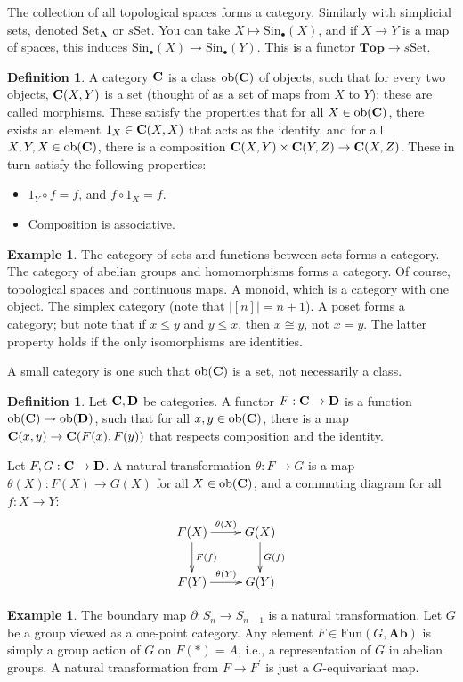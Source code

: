 \documentclass{amsart}
\theoremstyle{theorem}
\theoremstyle{definition}
\newtheorem{definition}[theorem]{Definition}
\newtheorem{example}[theorem]{Example}
\newcommand{\set}{{\mathrm{Set}}}
\newcommand{\Deltab}{{\mathbf \Delta}}
\newcommand{\Sin}{\mathrm{Sin}}
\begin{document}
The collection of all topological spaces forms a category. Similarly with simplicial sets, denoted $\set_\Deltab$ or $s\set$. You can take $X\mapsto \Sin_\bullet(X)$, and if $X\to Y$ is a map of spaces, this induces $\Sin_\bullet(X)\to\Sin_\bullet(Y)$. This is a functor $\mathbf{Top}\to s\set$.
\begin{definition}
A category $\mathbf C$ is a class $\mathrm{ob}(\mathbf C)$ of objects, such that for every two objects, $\mathbf C(X,Y)$ is a set (thought of as a set of maps from $X$ to $Y$); these are called morphisms. These satisfy the properties that for all $X\in\mathrm{ob}(\mathbf C)$, there exists an element $1_X\in\mathbf C(X,X)$ that acts as the identity, and for all $X,Y,X\in\mathrm{ob}(\mathbf C)$, there is a composition $\mathbf C(X,Y)\times\mathbf C(Y,Z)\to\mathbf C(X,Z)$. These in turn satisfy the following properties:
\begin{itemize}
\item $1_Y\circ f=f$, and $f\circ 1_X=f$.
\item Composition is associative.
\end{itemize}
\end{definition}
\begin{example}
The category of sets and functions between sets forms a category. The category of abelian groups and homomorphisms forms a category. Of course, topological spaces and continuous maps. A monoid, which is a category with one object. The simplex category (note that $|[n]|=n+1$). A poset forms a category; but note that if $x\leq y$ and $y\leq x$, then $x\cong y$, not $x=y$. The latter property holds if the only isomorphisms are identities.
\end{example}
A small category is one such that $\mathrm{ob}(\mathbf C)$ is a set, not necessarily a class.
\begin{definition}
Let $\mathbf C,\mathbf D$ be categories. A functor $F:\mathbf C\to\mathbf D$ is a function $\mathrm{ob}(\mathbf C)\to\mathrm{ob}(\mathbf D)$, such that for all $x,y\in\mathrm{ob}(\mathbf C)$, there is a map $\mathbf C(x,y)\to\mathbf C(F(x),F(y))$ that respects composition and the identity.

Let $F,G:\mathbf C\to\mathbf D$. A natural transformation $\theta:F\to G$ is a map $\theta(X):F(X)\to G(X)$ for all $X\in\mathrm{ob}(\mathbf C)$, and a commuting diagram for all $f:X\to Y$:
\begin{equation*}
\xymatrix{F(X)\ar[d]^{F(f)}\ar[r]^{\theta(X)} & G(X)\ar[d]^{G(f)}\\
F(Y)\ar[r]^{\theta(Y)} & G(Y)}
\end{equation*}
\end{definition}
\begin{example}
The boundary map $\partial:S_n\to S_{n-1}$ is a natural transformation. Let $G$ be a group viewed as a one-point category. Any element $F\in\mathrm{Fun}(G,\mathbf{Ab})$ is simply a group action of $G$ on $F(\ast)=A$, i.e., a representation of $G$ in abelian groups. A natural transformation from $F\to F^\prime$ is just a $G$-equivariant map.
\end{example}
\end{document}
